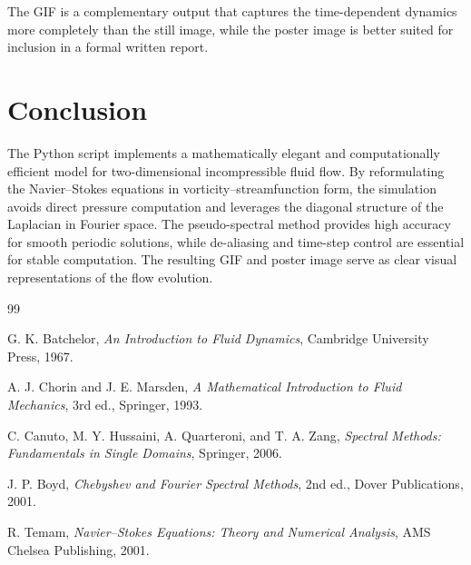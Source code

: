\documentclass[11pt]{article}
\begin{document}
The GIF is a complementary output that captures the time-dependent dynamics more completely than the still image, while the poster image is better suited for inclusion in a formal written report.

\section{Conclusion}

The Python script implements a mathematically elegant and computationally efficient model for two-dimensional incompressible fluid flow. By reformulating the Navier--Stokes equations in vorticity--streamfunction form, the simulation avoids direct pressure computation and leverages the diagonal structure of the Laplacian in Fourier space. The pseudo-spectral method provides high accuracy for smooth periodic solutions, while de-aliasing and time-step control are essential for stable computation. The resulting GIF and poster image serve as clear visual representations of the flow evolution.

\begin{thebibliography}{99}

G. K. Batchelor,
\textit{An Introduction to Fluid Dynamics},
Cambridge University Press, 1967.

A. J. Chorin and J. E. Marsden,
\textit{A Mathematical Introduction to Fluid Mechanics},
3rd ed., Springer, 1993.

C. Canuto, M. Y. Hussaini, A. Quarteroni, and T. A. Zang,
\textit{Spectral Methods: Fundamentals in Single Domains},
Springer, 2006.

J. P. Boyd,
\textit{Chebyshev and Fourier Spectral Methods},
2nd ed., Dover Publications, 2001.

R. Temam,
\textit{Navier--Stokes Equations: Theory and Numerical Analysis},
AMS Chelsea Publishing, 2001.

\end{thebibliography}
\end{document}
